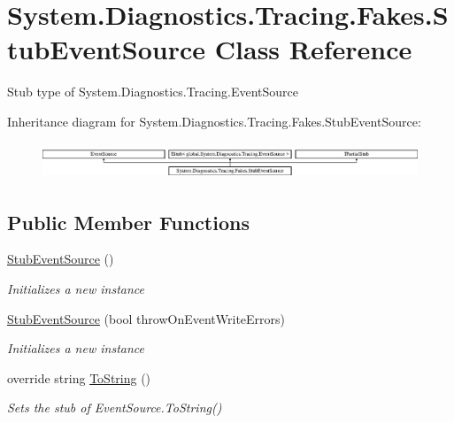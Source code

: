 \hypertarget{class_system_1_1_diagnostics_1_1_tracing_1_1_fakes_1_1_stub_event_source}{\section{System.\-Diagnostics.\-Tracing.\-Fakes.\-Stub\-Event\-Source Class Reference}
\label{class_system_1_1_diagnostics_1_1_tracing_1_1_fakes_1_1_stub_event_source}
}


Stub type of System.\-Diagnostics.\-Tracing.\-Event\-Source 


Inheritance diagram for System.\-Diagnostics.\-Tracing.\-Fakes.\-Stub\-Event\-Source\-:\begin{figure}[H]
\begin{center}
\leavevmode
\includegraphics[height=1.088435cm]{class_system_1_1_diagnostics_1_1_tracing_1_1_fakes_1_1_stub_event_source}
\end{center}
\end{figure}
\subsection*{Public Member Functions}
\begin{DoxyCompactItemize}
\item 
\hyperlink{class_system_1_1_diagnostics_1_1_tracing_1_1_fakes_1_1_stub_event_source_a9a7e84d33ff04a40fa93120b70f6593a}{Stub\-Event\-Source} ()
\begin{DoxyCompactList}\small\item\em Initializes a new instance\end{DoxyCompactList}\item 
\hyperlink{class_system_1_1_diagnostics_1_1_tracing_1_1_fakes_1_1_stub_event_source_a40ab119ac722603a57ec314c656028da}{Stub\-Event\-Source} (bool throw\-On\-Event\-Write\-Errors)
\begin{DoxyCompactList}\small\item\em Initializes a new instance\end{DoxyCompactList}\item 
override string \hyperlink{class_system_1_1_diagnostics_1_1_tracing_1_1_fakes_1_1_stub_event_source_a9a5918a73d8b8bc44b9d3cf8afbc0541}{To\-String} ()
\begin{DoxyCompactList}\small\item\em Sets the stub of Event\-Source.\-To\-String()\end{DoxyCompactList}\end{DoxyCompactItemize}
